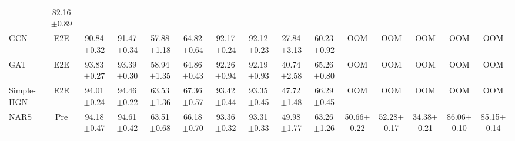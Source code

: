 \documentclass[lettersize,journal]{IEEEtran}
\begin{document}
\begin{table*}[!tp]
{\begin{tabular}{l c c c c c c c c c c c c c c}
                                                                                                                                                                                                & 82.16$\pm$0.89 \\GCN            & E2E     & 90.84$\pm$0.32 & 91.47$\pm$0.34 & 57.88$\pm$1.18 & 64.82$\pm$0.64 & 92.17$\pm$0.24 & 92.12$\pm$0.23 & 27.84$\pm$3.13 & 60.23$\pm$0.92 & OOM & OOM & OOM & OOM & OOM   \\GAT            & E2E     & 93.83$\pm$0.27 & 93.39$\pm$0.30 & 58.94$\pm$1.35 & 64.86$\pm$0.43 & 92.26$\pm$0.94 & 92.19$\pm$0.93 & 40.74$\pm$2.58 & 65.26$\pm$0.80 & OOM & OOM & OOM & OOM & OOM   \\Simple-HGN     & E2E     & 94.01$\pm$0.24 & 94.46$\pm$0.22 & 63.53$\pm$1.36 & 67.36$\pm$0.57 & 93.42$\pm$0.44 & 93.35$\pm$0.45 & 47.72$\pm$1.48 & 66.29$\pm$0.45 & OOM & OOM & OOM & OOM & OOM  \\\hline



NARS           & Pre     & 94.18$\pm$0.47 & 94.61$\pm$0.42  & 63.51$\pm$0.68 & 66.18$\pm$0.70 & 93.36$\pm$0.32 & 93.31$\pm$0.33  & 49.98$\pm$1.77 & 63.26$\pm$1.26 &50.66$\pm$0.22 & 52.28$\pm$0.17 
                                                                                                                                                                                           & 34.38$\pm$0.21 
                                                                                                                                                                                                 & 
                                                                                                                                                                                                
                                                                                                                                                                                                86.06$\pm$0.10      
                                                                                                                                                                                                             & 85.15$\pm$0.14\\




\end{tabular}}
\end{table*}
\end{document}
